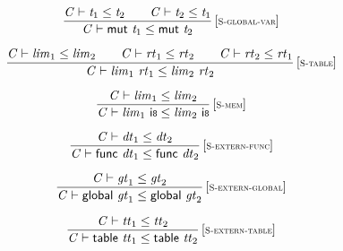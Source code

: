 $$
\begin{array}{@{}c@{}}\displaystyle
\frac{
{\mathit{C}} \vdash {\mathit{t}}_{{1}} \leq {\mathit{t}}_{{2}}
 \qquad
{\mathit{C}} \vdash {\mathit{t}}_{{2}} \leq {\mathit{t}}_{{1}}
}{
{\mathit{C}} \vdash \mathsf{mut}~{\mathit{t}}_{{1}} \leq \mathsf{mut}~{\mathit{t}}_{{2}}
} \, {[\textsc{\scriptsize S{-}global{-}var}]}
\qquad
\end{array}
$$

$$
\begin{array}{@{}c@{}}\displaystyle
\frac{
{\mathit{C}} \vdash {\mathit{lim}}_{{1}} \leq {\mathit{lim}}_{{2}}
 \qquad
{\mathit{C}} \vdash {\mathit{rt}}_{{1}} \leq {\mathit{rt}}_{{2}}
 \qquad
{\mathit{C}} \vdash {\mathit{rt}}_{{2}} \leq {\mathit{rt}}_{{1}}
}{
{\mathit{C}} \vdash {\mathit{lim}}_{{1}}~{\mathit{rt}}_{{1}} \leq {\mathit{lim}}_{{2}}~{\mathit{rt}}_{{2}}
} \, {[\textsc{\scriptsize S{-}table}]}
\qquad
\end{array}
$$

$$
\begin{array}{@{}c@{}}\displaystyle
\frac{
{\mathit{C}} \vdash {\mathit{lim}}_{{1}} \leq {\mathit{lim}}_{{2}}
}{
{\mathit{C}} \vdash {\mathit{lim}}_{{1}}~\mathsf{i{\scriptstyle8}} \leq {\mathit{lim}}_{{2}}~\mathsf{i{\scriptstyle8}}
} \, {[\textsc{\scriptsize S{-}mem}]}
\qquad
\end{array}
$$

\vspace{1ex}

$$
\begin{array}{@{}c@{}}\displaystyle
\frac{
{\mathit{C}} \vdash {\mathit{dt}}_{{1}} \leq {\mathit{dt}}_{{2}}
}{
{\mathit{C}} \vdash \mathsf{func}~{\mathit{dt}}_{{1}} \leq \mathsf{func}~{\mathit{dt}}_{{2}}
} \, {[\textsc{\scriptsize S{-}extern{-}func}]}
\qquad
\end{array}
$$

$$
\begin{array}{@{}c@{}}\displaystyle
\frac{
{\mathit{C}} \vdash {\mathit{gt}}_{{1}} \leq {\mathit{gt}}_{{2}}
}{
{\mathit{C}} \vdash \mathsf{global}~{\mathit{gt}}_{{1}} \leq \mathsf{global}~{\mathit{gt}}_{{2}}
} \, {[\textsc{\scriptsize S{-}extern{-}global}]}
\qquad
\end{array}
$$

$$
\begin{array}{@{}c@{}}\displaystyle
\frac{
{\mathit{C}} \vdash {\mathit{tt}}_{{1}} \leq {\mathit{tt}}_{{2}}
}{
{\mathit{C}} \vdash \mathsf{table}~{\mathit{tt}}_{{1}} \leq \mathsf{table}~{\mathit{tt}}_{{2}}
} \, {[\textsc{\scriptsize S{-}extern{-}table}]}
\qquad
\end{array}
$$

